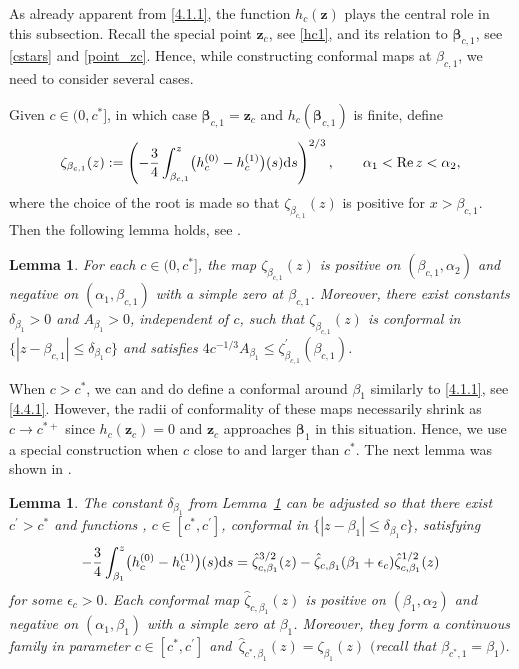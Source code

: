 \documentclass[pdftex]{sigma}
\numberwithin{equation}{section}
\newtheorem{Lemma}[Theorem]{Lemma}
\newcommand{\re}{\operatorname{Re} }
\newcommand{\z}	{{\boldsymbol z}}
\begin{document}
As already apparent from \eqref{4.1.1}, the function $ h_c(\z) $ plays the central role in this subsection. Recall the special point $ \z_c $, see \eqref{hc1}, and its relation to $ \boldsymbol\beta_{c,1} $, see \eqref{cstars} and \eqref{point_zc}. Hence, while constructing conformal maps at $ \beta_{c,1} $, we need to consider several cases.

Given $ c\in (0,c^*] $, in which case $ \boldsymbol\beta_{c,1}=\z_c $ and $ h_c(\boldsymbol\beta_{c,1})$ is finite, define
\begin{equation}
\label{4.2.1}
\zeta_{\beta_{c,1}}(z) := \left(-\frac34\int_{\beta_{c,1}}^z\bigl(h_c^{(0)}-h_c^{(1)}\bigr)(s) {\rm d}s\right)^{2/3}, \qquad \alpha_1<\re z<\alpha_2,
\end{equation}
where the choice of the root is made so that $ \zeta_{\beta_{c,1}}(z) $ is positive for $ x>\beta_{c,1} $. Then the following lemma holds, see \cite[Lemma~7.5]{ApDenYa21}.

\begin{Lemma}
\label{lem:4.2}
For each $ c\in(0,c^*] $, the map $ \zeta_{\beta_{c,1}}(z) $ is positive on $ (\beta_{c,1},\alpha_2) $ and negative on $ (\alpha_1,\beta_{c,1}) $ with a simple zero at $ \beta_{c,1} $. Moreover, there exist constants $ \delta_{\beta_1}>0 $ and $ A_{\beta_1}>0 $, independent of $ c $, such that $ \zeta_{\beta_{c,1}}(z) $ is conformal in $ \{|z-\beta_{c,1}| \leq \delta_{\beta_1}c \} $ and satisfies $ 4c^{-1/3} A_{\beta_1} \leq \zeta_{\beta_{c,1}}^\prime(\beta_{c,1}) $.
\end{Lemma}

When $ c>c^* $, we can and do define a conformal around $ \beta_1 $ similarly to \eqref{4.1.1}, see \eqref{4.4.1}. However, the radii of conformality of these maps necessarily shrink as $ c\to c^{*+} $ since $ h_c(\z_c)=0 $ and $ \z_c $ approaches $ \boldsymbol \beta_1 $ in this situation. Hence, we use a special construction when $ c $ close to and larger than $ c^* $. The next lemma was shown in \cite[Lemma~7.6]{ApDenYa21}.

\begin{Lemma}
\label{lem:4.3}
The constant $ \delta_{\beta_1} $ from Lemma~{\rm\ref{lem:4.2}} can be adjusted so that there exist $ c^\prime>c^* $ and functions , $ c\in[c^*,c^\prime] $, conformal in $ \{|z-\beta_1| \leq \delta_{\beta_1}c\} $, satisfying
\begin{equation}
\label{4.3.4}
-\frac34\int_{\beta_1}^z\bigl(h_c^{(0)}-h_c^{(1)}\bigr)(s) {\rm d}s = \hat\zeta_{c,\beta_1}^{3/2}(z) - \hat\zeta_{c,\beta_1}(\beta_1+\epsilon_c)\hat\zeta_{c,\beta_1}^{1/2}(z)
\end{equation}
for some $ \epsilon_c>0 $. Each conformal map $ \hat\zeta_{c,\beta_1}(z) $ is positive on $ (\beta_1,\alpha_2) $ and negative on $ (\alpha_1,\beta_1) $ with a simple zero at $ \beta_1 $. Moreover, they form a continuous family in parameter $ c\in[c^*,c^\prime] $ and~$ \hat\zeta_{c^*,\beta_1}(z) = \zeta_{\beta_1}(z) $ $($recall that $ \beta_{c^*,1}=\beta_1)$.
\end{Lemma}
\end{document}
